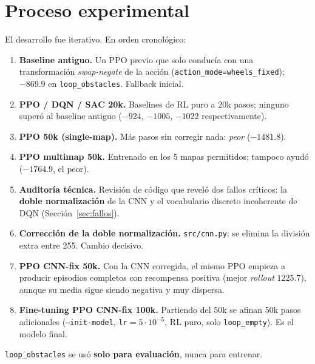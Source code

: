 \documentclass[11pt,a4paper]{article}
\newcommand{\code}[1]{\texttt{#1}}
\begin{document}
\section{Proceso experimental}
El desarrollo fue iterativo. En orden cronológico:
\begin{enumerate}
  \item \textbf{Baseline antiguo.} Un PPO previo que solo conducía con una transformación
  \emph{swap-negate} de la acción (\code{action\_mode=wheels\_fixed}); $-869.9$ en
  \code{loop\_obstacles}. Fallback inicial.
  \item \textbf{PPO / DQN / SAC 20k.} Baselines de RL puro a 20k pasos; ninguno superó al
  baseline antiguo ($-924$, $-1005$, $-1022$ respectivamente).
  \item \textbf{PPO 50k (single-map).} Más pasos sin corregir nada: \emph{peor} ($-1481.8$).
  \item \textbf{PPO multimap 50k.} Entrenado en los 5 mapas permitidos; tampoco ayudó
  ($-1764.9$, el peor).
  \item \textbf{Auditoría técnica.} Revisión de código que reveló dos fallos críticos: la
  \textbf{doble normalización} de la CNN y el vocabulario discreto incoherente de DQN
  (Sección~\ref{sec:fallos}).
  \item \textbf{Corrección de la doble normalización.} \code{src/cnn.py}: se elimina la
  división extra entre 255. Cambio decisivo.
  \item \textbf{PPO CNN-fix 50k.} Con la CNN corregida, el mismo PPO empieza a producir
  episodios completos con recompensa positiva (mejor \emph{rollout} $1225.7$), aunque su
  media sigue siendo negativa y muy dispersa.
  \item \textbf{Fine-tuning PPO CNN-fix 100k.} Partiendo del 50k se afinan 50k pasos
  adicionales (\code{--init-model}, \code{lr}$=5\cdot10^{-5}$, RL puro, solo
  \code{loop\_empty}). Es el modelo final.
\end{enumerate}
\code{loop\_obstacles} se usó \textbf{solo para evaluación}, nunca para entrenar.
\end{document}

